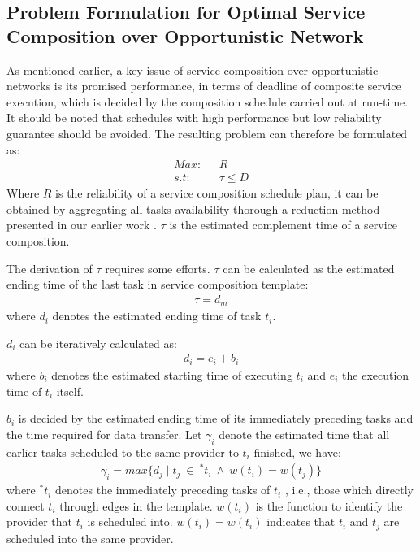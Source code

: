 \documentclass[journal]{IEEEtran}
\begin{document}
\subsection{Problem Formulation for Optimal Service Composition over Opportunistic Network}

As mentioned earlier, a key issue of service composition over opportunistic networks is its promised performance, in terms of deadline of composite service execution, which is decided by the composition schedule carried out at run-time. It should be noted that schedules with high performance but low reliability guarantee should be avoided. The resulting problem can therefore be formulated as:
\begin{align}
Max    : \ \ \ & R   \\\nonumber
s.t    : \ \ \ & \tau \le D
\end{align}
Where $R$ is the reliability of a service composition schedule plan, it can be obtained by aggregating all tasks availability thorough a reduction method presented in our earlier work \cite{xia2009novel}. $\tau$ is the estimated complement time of a service composition. 

The derivation of $\tau$ requires some efforts. $\tau$ can be calculated as the estimated ending time of the last task in service composition template:
\begin{align}
\tau = d_m
\end{align}
where $d_i$ denotes the estimated ending time of task $t_i$.

$d_i$ can be iteratively calculated as:
\begin{align}
d_i = e_i + b_i
\end{align}
where $b_i$ denotes the estimated starting time of executing $t_i$ and $e_i$ the execution time of $t_i$ itself.

$b_i$ is decided by the estimated ending time of its immediately preceding tasks and the time required for data transfer. Let $\gamma_i$ denote the estimated time that all earlier tasks scheduled to the same provider to $t_i$ finished, we have:
\begin{align}
\gamma_i =  max\{d_j \mid t_j \ \in \ ^{*}t_i \ \wedge \ w(t_i) = w(t_j) \}
\end{align}
where $^{*}t_i$ denotes the immediately preceding tasks of $t_i$ , i.e., those which directly connect $t_i$ through edges in the template. 
$w(t_i)$ is the function to identify the provider that $t_i$ is scheduled into. $w(t_i) = w(t_i)$ indicates that $t_i$ and $t_j$ are scheduled into the same provider.
\end{document}
